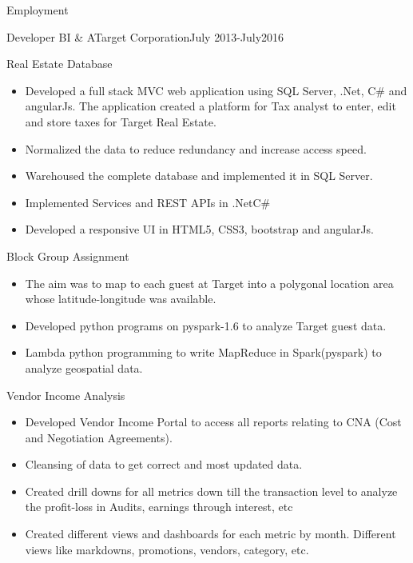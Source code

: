 \documentclass[]{nakulcv}
\begin{document}
	\makeheader
	
	\begin{cvsection}{Employment}
		\begin{cvsubsection}{Developer BI \& A}{Target Corporation}{July 2013-July2016}
		\begin{cvsubsection}{Real Estate Database}{}{}
				\begin{itemize}
					\item	Developed a full stack MVC web application using SQL Server, .Net, C\# and angularJs. The application created a platform for Tax analyst to enter, edit and store taxes for Target Real Estate.
					\item Normalized the data to reduce redundancy and increase access speed. 
					\item Warehoused the complete database and implemented it in SQL Server.
					\item Implemented Services and REST APIs in .Net\/C\#
					\item Developed a responsive UI in HTML5, CSS3, bootstrap and angularJs.
				\end{itemize}
			\end{cvsubsection}
			\begin{cvsubsection}{Block Group Assignment}{}{}
				\begin{itemize}
					\item The aim was to map to each guest at Target into a polygonal location area whose latitude-longitude was available.
					\item Developed python programs on pyspark-1.6 to analyze Target guest data.   
					\item Lambda python programming to write MapReduce in Spark(pyspark) to analyze geospatial data.
				\end{itemize}
			\end{cvsubsection}
			\begin{cvsubsection}{Vendor Income Analysis}{}{}
				\begin{itemize}
					\item Developed Vendor Income Portal to access all reports relating to CNA (Cost and Negotiation Agreements).
					\item Cleansing of data to get correct and most updated data.
					\item Created drill downs for all metrics down till the transaction level to analyze the profit-loss in Audits, earnings through interest, etc
					\item Created different views and dashboards for each metric by month. Different views like markdowns, promotions, vendors, category, etc.

\end{itemize}
\end{cvsubsection}
\end{cvsubsection}
\end{cvsection}
\end{document}
